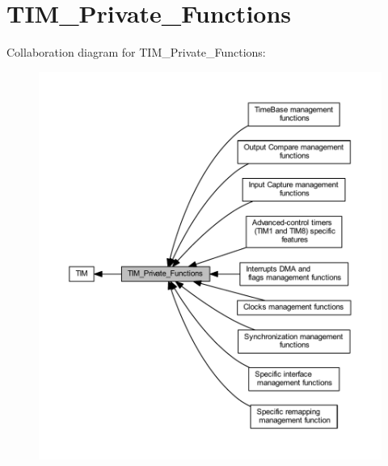 \hypertarget{group___t_i_m___private___functions}{}\section{T\+I\+M\+\_\+\+Private\+\_\+\+Functions}
\label{group___t_i_m___private___functions}
Collaboration diagram for T\+I\+M\+\_\+\+Private\+\_\+\+Functions\+:\nopagebreak
\begin{figure}[H]
\begin{center}
\leavevmode
\includegraphics[width=350pt]{group___t_i_m___private___functions}
\end{center}
\end{figure}
